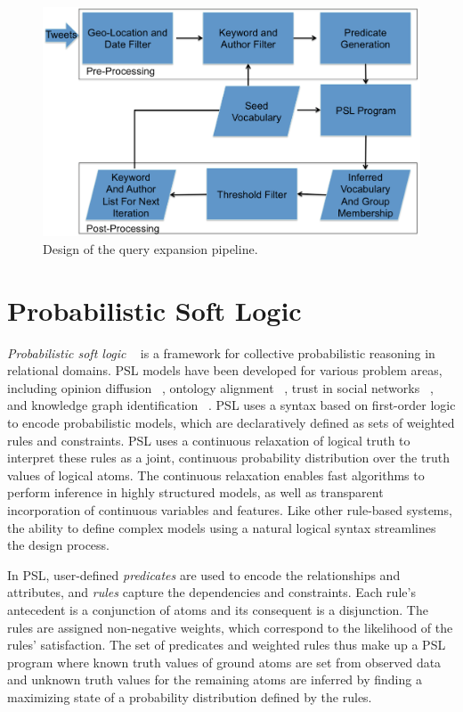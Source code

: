 \begin{figure}
	\centering
	\includegraphics[scale=0.25]{support_files/flowChart.png}
	\caption{Design of the query expansion pipeline.}
	\label{fig:flowchart}
\end{figure}
\section{Probabilistic Soft Logic}
\emph{Probabilistic soft logic} ~\cite{kimmig2012short,broecheler2010probabilistic} is a framework for collective probabilistic reasoning in relational domains.
PSL models have been developed for various problem areas, including opinion diffusion ~\cite{bach2012scaling}, ontology alignment ~\cite{broecheler2010probabilistic}, trust in social networks ~\cite{huang2013flexible}, and knowledge graph identification ~\cite{pujara2013knowledge}.
PSL uses a syntax based on first-order logic to encode probabilistic models, which are declaratively defined as sets of weighted rules and constraints. PSL uses a continuous relaxation of logical truth to interpret these rules as a joint, continuous probability distribution over the truth values of logical atoms. The continuous relaxation enables fast algorithms to perform inference in highly structured models, as well as transparent incorporation of continuous variables and features. Like other rule-based systems, the ability to define complex models using a natural logical syntax streamlines the design process.

In PSL, user-defined \emph{predicates} are used to encode the relationships and attributes, and \emph{rules} capture the dependencies and constraints.
Each rule's antecedent is a conjunction of atoms and its consequent is a disjunction. 
The rules are assigned non-negative weights, which correspond to the likelihood of the rules' satisfaction. 
The set of predicates and weighted rules thus make up a PSL program where known truth values of ground atoms are set from observed data and unknown truth values for the remaining atoms are inferred by finding a maximizing state of a probability distribution defined by the rules.

